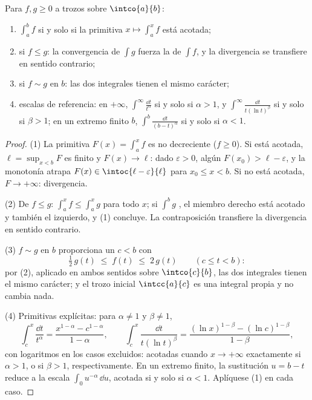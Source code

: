 \begin{theorem}\label{thm:b2:integration:comparison}
Para $f, g \geq 0$  a trozos sobre $\intco{a}{b}$:
\begin{enumerate}
  \item $\int_a^b f$  si y solo si la primitiva $x \mapsto
        \int_a^x f$ está acotada;
  \item si $f \leq g$: la convergencia de $\int g$ fuerza la de
        $\int f$, y la divergencia se transfiere en sentido
        contrario;
  \item si $f \sim g$ en $b$: las dos integrales tienen el mismo
        carácter;
  \item escalas de referencia: en $+\infty$, $\int^{\infty}
        \frac{\dd t}{t^\alpha}$  si y solo si $\alpha > 1$, y
        $\int^\infty \frac{\dd t}{t(\ln t)^\beta}$ si y solo si
        $\beta > 1$; en un extremo finito $b$, $\int^b \frac{\dd
        t}{(b - t)^\alpha}$  si y solo si $\alpha < 1$.
\end{enumerate}
\end{theorem}

\begin{proof}
(1) La primitiva $F(x) = \int_a^x f$ es no decreciente ($f \geq 0$).
Si está acotada, $\ell = \sup_{x < b}F$ es finito y $F(x) \to \ell$:
dado $\varepsilon > 0$, algún $F(x_0) > \ell - \varepsilon$, y la
monotonía atrapa $F(x) \in \intoc{\ell - \varepsilon}{\ell}$ para
$x_0 \leq x < b$. Si no está acotada, $F \to +\infty$: divergencia.

(2) De $f \leq g$: $\int_a^x f \leq \int_a^x g$ para todo $x$; si
$\int^b g$ , el miembro derecho está acotado y también el
izquierdo, y (1) concluye. La contraposición transfiere la
divergencia en sentido contrario.

(3) $f \sim g$ en $b$ proporciona un $c < b$ con
\[
\tfrac12\,g(t) \;\leq\; f(t) \;\leq\; 2\,g(t)
\qquad (c \leq t < b) :
\]
por (2), aplicado en ambos sentidos sobre $\intco{c}{b}$, las dos
integrales tienen el mismo carácter; y el trozo inicial
$\intcc{a}{c}$ es una integral propia y no cambia nada.

(4) Primitivas explícitas: para $\alpha \neq 1$ y $\beta \neq 1$,
\[
\int_c^x \frac{\dd t}{t^\alpha}
= \frac{x^{1-\alpha} - c^{1-\alpha}}{1 - \alpha},
\qquad
\int_c^x \frac{\dd t}{t(\ln t)^\beta}
= \frac{(\ln x)^{1-\beta} - (\ln c)^{1-\beta}}{1 - \beta},
\]
con logaritmos en los casos excluidos: acotadas cuando $x \to
+\infty$ exactamente si $\alpha > 1$, o si $\beta > 1$,
respectivamente. En un extremo finito, la sustitución $u = b - t$
reduce a la escala $\int_0 u^{-\alpha}\,\dd u$, acotada si y solo si
$\alpha < 1$. Aplíquese (1) en cada caso.
\end{proof}

